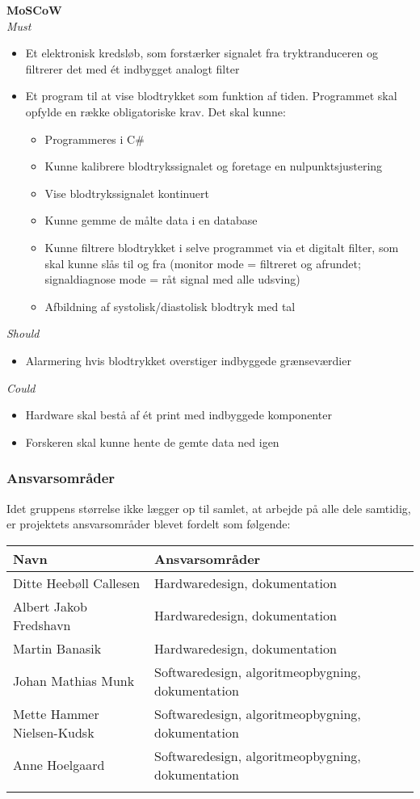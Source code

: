 \textbf{MoSCoW}
\\
\textit{Must}
\begin{itemize}
\item Et elektronisk kredsløb, som forstærker signalet fra tryktranduceren og filtrerer det med ét indbygget analogt filter
\item Et program til at vise blodtrykket som funktion af tiden. Programmet skal opfylde en række obligatoriske krav. Det skal kunne:
\begin{itemize}
\item Programmeres i C\#
\item Kunne kalibrere blodtrykssignalet og foretage en nulpunktsjustering
\item Vise blodtrykssignalet kontinuert
\item Kunne gemme de målte data i en database
\item Kunne filtrere blodtrykket i selve programmet via et digitalt filter, som skal kunne slås til og fra (monitor mode = filtreret og afrundet; signaldiagnose mode = råt signal med alle udsving)
\item Afbildning af systolisk/diastolisk blodtryk med tal
\end{itemize}
\end{itemize}
\textit{Should}
\begin{itemize}
\item Alarmering hvis blodtrykket overstiger indbyggede grænseværdier
\end{itemize}
\textit{Could}
\begin{itemize}
\item Hardware skal bestå af ét print med indbyggede komponenter
\item Forskeren skal kunne hente de gemte data ned igen
\end{itemize} 

\subsubsection{Ansvarsområder}

Idet gruppens størrelse ikke lægger op til samlet, at arbejde på alle dele samtidig, er projektets ansvarsområder blevet fordelt som følgende:

\begin{longtabu} to 
    Navn &    Ansvarsområder &    \\[-1ex]
    \midrule
    Ditte Heebøll Callesen &   Hardwaredesign, dokumentation	&    \\
    Albert Jakob Fredshavn &   Hardwaredesign, dokumentation	&    \\
    Martin Banasik         &   Hardwaredesign, dokumentation	&    \\
    Johan Mathias Munk     &   Softwaredesign, algoritmeopbygning, dokumentation &    \\
    Mette Hammer Nielsen-Kudsk &   Softwaredesign, algoritmeopbygning, dokumentation &    \\
   	Anne Hoelgaard    &   Softwaredesign, algoritmeopbygning, dokumentation	&    \\
\label{version_Systemark}
\end{longtabu}